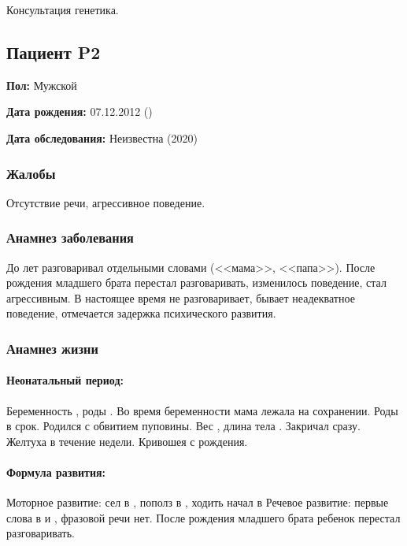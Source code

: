 \documentclass[a4paper,14pt]{extarticle}
\newcommand{\gramm}{г}
\newcommand{\cm}{см}
\newcommand{\months}{мес.}
\begin{document}
Консультация генетика.

\newpage
\subsection*{Пациент P2}

\textbf{Пол:} Мужской

\textbf{Дата рождения:} 07.12.2012 ()

\textbf{Дата обследования:} Неизвестна (2020)

\subsubsection*{Жалобы}

Отсутствие речи, агрессивное поведение.

\subsubsection*{Анамнез заболевания}

До  лет разговаривал отдельными словами (<<мама>>, <<папа>>).
После рождения младшего брата перестал разговаривать, изменилось поведение, стал агрессивным. 
В настоящее время не разговаривает, бывает неадекватное поведение, отмечается задержка психического развития.

\subsubsection*{Анамнез жизни}

\paragraph{Неонатальный период:} Беременность , роды .
Во время беременности мама лежала на сохранении. Роды в срок. Родился с обвитием пуповины.
Вес \numprint[\gramm]{3710}, длина тела \numprint[\cm]{54}. Закричал сразу. Желтуха в течение недели. Кривошея с рождения.

\paragraph{Формула развития:} Моторное развитие: сел в \numprint[\months]{9}, пополз в \numprint[\months]{8}, ходить начал в \numprint[\months]{10}
Речевое развитие: первые слова в  и \numprint[\months]{3}, фразовой речи нет. После рождения младшего брата ребенок перестал разговаривать. 
\end{document}
